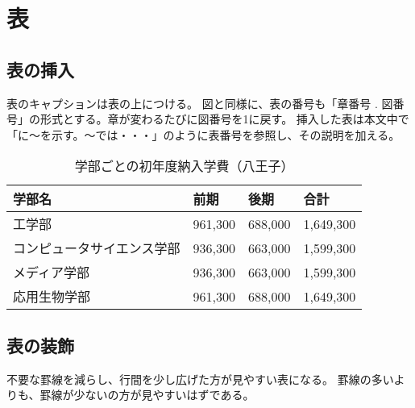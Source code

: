 \chapter{表}

\begin{comment}
    \begin{textblock}{4.5}(1, 21.5)
        \noindent
        【16,18】表番号は章ごとの通し番号で抜けがない
    \end{textblock}
    \begin{textblock}{5}(14.5, 13)
        ←表のキャプションは上
    \end{textblock}
\end{comment}

\section{表の挿入}

表のキャプションは表の上につける。
図と同様に、表の番号も「章番号 . 図番号」の形式とする。章が変わるたびに図番号を1に戻す。
挿入した表は本文中で「に〜を示す。〜では・・・」のように表番号を参照し、その説明を加える。

\begin{table}[htbp]
	\centering
	\label{tab:tuition}
    \caption{学部ごとの初年度納入学費（八王子）}
    {\renewcommand\arraystretch{1.2}
	\begin{tabular}{l|l|l|l}
		\hline \hline
		学部名 & 前期 & 後期 & 合計\\
		\hline
		工学部 & 961,300 & 688,000 &  1,649,300\\
		コンピュータサイエンス学部 & 936,300 & 663,000 & 1,599,300 \\
		メディア学部 & 936,300 & 663,000 & 1,599,300\\
		応用生物学部 & 961,300 & 688,000 & 1,649,300\\
		\hline
	\end{tabular}
    }
\end{table}

\section{表の装飾}

不要な罫線を減らし、行間を少し広げた方が見やすい表になる。
罫線の多いよりも、罫線が少ないの方が見やすいはずである。

